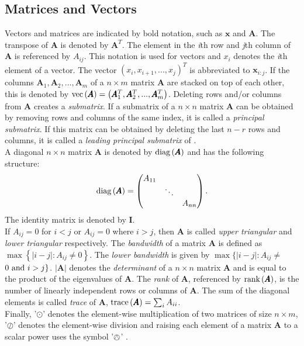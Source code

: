 \subsection{Matrices and Vectors}
Vectors and matrices are indicated by bold notation, such as $\pmb{x}$ and $\pmb{A}$. The transpose of $\pmb{A}$ is denoted by $\pmb{A}^T$. The element in the \textit{i}th row and \textit{j}th column of $\pmb{A}$ is referenced by $A_{ij}$. This notation is used for vectors and $x_i$ denotes the \textit{i}th element of a vector. The vector $\left(x_i,x_{i+1},...,x_j\right)^T$ is abbreviated to $\pmb{x}_{i:j}$. If the columns $\pmb{A}_1, \pmb{A}_2,...,\pmb{A}_m$ of a $n\times m$ matrix $\pmb{A}$ are stacked on top of each other, this is denoted by $\hbox{vec}\left(\pmb{A}\right)=\left(\pmb{A}_1^T,\pmb{A}_2^T,...,\pmb{A}_m^T\right)$. Deleting rows and/or columns from $\pmb{A}$ creates a \textit{submatrix}. If a submatrix of a $n\times n$ matrix $\pmb{A}$ can be obtained by removing rows and columns of the same index, it is called a \textit{principal submatrix}. If this matrix can be obtained by deleting the last $n-r$ rows and columns, it is called a \textit{leading principal submatrix} of . \\
A diagonal $n\times n$ matrix $\pmb{A}$ is denoted by $\hbox{diag}\left(\pmb{A}\right)$ and has the following structure:
\begin{equation*}
    \hbox{diag}\left(\pmb{A}\right)=\begin{pmatrix}
    A_{11} \\
    & \ddots \\
    &&A_{nn}
    \end{pmatrix}.
\end{equation*}
The identity matrix is denoted by $\pmb{I}$. \\
If $A_{ij}=0$ for $i<j$ or $A_{ij} = 0$ where $i>j$, then $\pmb{A}$ is called \textit{upper triangular} and \textit{lower triangular} respectively. The \textit{bandwidth} of a matrix $\pmb{A}$ is defined as $\max\left\lbrace|i-j|:A_{ij}\neq0\right\rbrace$. The \textit{lower bandwidth} is given by $\max\lbrace|i-j|:A_{ij}\neq $ $0\hbox{ and } i > j\rbrace$. $|\pmb{A}|$ denotes the \textit{determinant} of a $n\times n$ matrix $\pmb{A}$ and is equal to the product of the eigenvalues of $\pmb{A}$. The \textit{rank} of $\pmb{A}$, referenced by $\hbox{rank}\left(\pmb{A}\right)$, is the number of linearly independent rows or columns of $\pmb{A}$. The sum of the diagonal elements is called \textit{trace} of $\pmb{A}$, $\hbox{trace}\left(\pmb{A}\right)=\sum_{i}A_{ii}$.\\
Finally, '$\odot$' denotes the element-wise multiplication of two matrices of size $n\times m$, '$\oslash$' denotes the element-wise division and raising each element of a matrix $\pmb{A}$ to a scalar power uses the symbol '$\owedge$'  \autocite[][14--15]{rue2005gaussian}.
